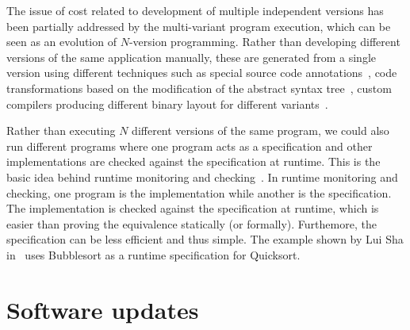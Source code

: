 The issue of cost related to development of multiple independent versions has
been partially addressed by the multi-variant program execution, which can be seen
as an evolution of $N$-version programming. Rather than developing different versions
of the same application manually, these are generated from a single version
using different techniques such as special source code
annotations~\cite{onlinevalidation,trachsel10}, code transformations based on
the modification of the abstract syntax tree~\cite{schulte14,sosie:issta14},
custom compilers producing different binary layout for different
variants~\cite{orchestra09,unibus:nspw10}. %

Rather than executing $N$ different versions of the same program, we could also
run different programs where one program acts as a specification and other
implementations are checked against the specification at runtime.  This is the
basic idea behind runtime monitoring and checking~\cite{kim:mac,java-mac01}. In
runtime monitoring and checking, one program is the implementation while
another is the specification. The implementation is checked against the
specification at runtime, which is easier than proving the equivalence
statically (or formally).  Furthemore, the specification can be less efficient
and thus simple. The example shown by Lui Sha in~\cite{lui01} uses Bubblesort
as a runtime specification for Quicksort.


\section{Software updates}


